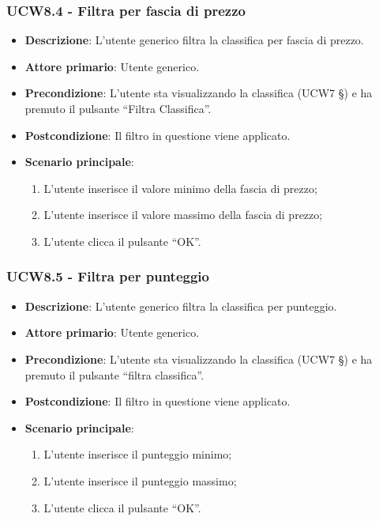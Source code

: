 \subsubsection{UCW8.4 - Filtra per fascia di prezzo}
\begin{itemize}
	\item \textbf{Descrizione}: L'utente generico filtra la classifica per fascia di prezzo.
    \item \textbf{Attore primario}: Utente generico.
    \item \textbf{Precondizione}: L’utente sta visualizzando la classifica (UCW7 §) e ha premuto il pulsante “Filtra Classifica”.
    \item \textbf{Postcondizione}: Il filtro in questione viene applicato.
    \item \textbf{Scenario principale}: 
    \begin{enumerate}
        \item L’utente inserisce il valore minimo della fascia di prezzo;
        \item L’utente inserisce il valore massimo della fascia di prezzo;
        \item L’utente clicca il pulsante “OK”.
    \end{enumerate}
\end{itemize}

\subsubsection{UCW8.5 - Filtra per punteggio}
\begin{itemize}
	\item \textbf{Descrizione}: L'utente generico filtra la classifica per punteggio.
    \item \textbf{Attore primario}: Utente generico.
    \item \textbf{Precondizione}: L’utente sta visualizzando la classifica (UCW7 §) e ha premuto il pulsante “filtra classifica”.
    \item \textbf{Postcondizione}: Il filtro in questione viene applicato.
    \item \textbf{Scenario principale}: 
    \begin{enumerate}
        \item L’utente inserisce il punteggio minimo;
        \item L’utente inserisce il punteggio massimo;
        \item L’utente clicca il pulsante “OK”.
    \end{enumerate}
\end{itemize}


